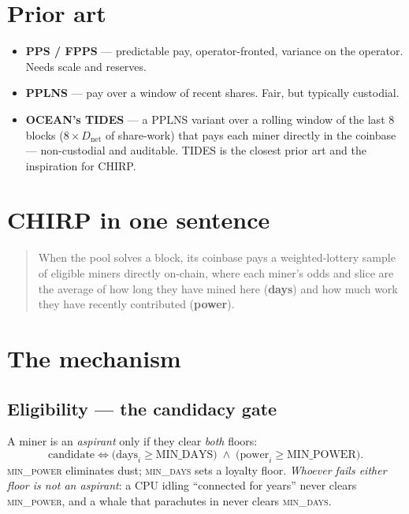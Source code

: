 \documentclass[11pt]{article}
\begin{document}
\section{Prior art}
\begin{itemize}[leftmargin=1.4em]
  \item \textbf{PPS / FPPS} --- predictable pay, operator-fronted, variance on the operator. Needs
  scale and reserves.
  \item \textbf{PPLNS} --- pay over a window of recent shares. Fair, but typically custodial.
  \item \textbf{OCEAN's TIDES} --- a PPLNS variant over a rolling window of the last 8 blocks
  ($8 \times D_{\text{net}}$ of share-work) that pays each miner directly in the coinbase ---
  non-custodial and auditable. TIDES is the closest prior art and the inspiration for CHIRP.
\end{itemize}

\section{CHIRP in one sentence}
\begin{quote}
When the pool solves a block, its coinbase pays a weighted-lottery sample of eligible miners
directly on-chain, where each miner's odds and slice are the average of how long they have mined
here (\textbf{days}) and how much work they have recently contributed (\textbf{power}).
\end{quote}

\section{The mechanism}

\subsection{Eligibility --- the candidacy gate}
A miner is an \emph{aspirant} only if they clear \emph{both} floors:
\[
  \text{candidate} \iff \big( \text{days}_i \ge \text{MIN\_DAYS} \big) \;\wedge\;
  \big( \text{power}_i \ge \text{MIN\_POWER} \big).
\]
\textsc{min\_power} eliminates dust; \textsc{min\_days} sets a loyalty floor. \emph{Whoever fails
either floor is not an aspirant}: a CPU idling ``connected for years'' never clears \textsc{min\_power}, and a whale
that parachutes in never clears \textsc{min\_days}.
\end{document}
